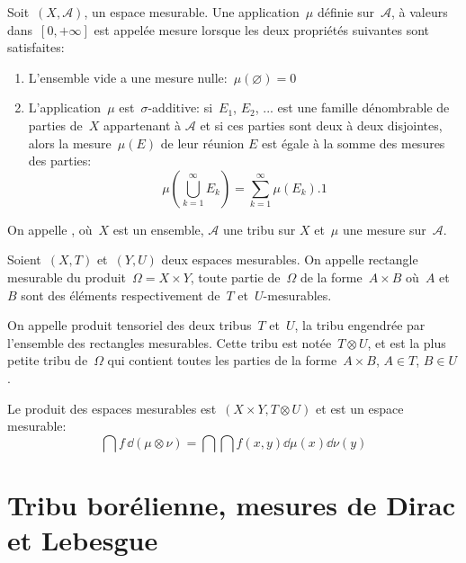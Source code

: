 \begin{definition}[Mesure]
\medskip
Soit~$(X,\mathcal{A})$, un espace mesurable.
Une application~$\mu$ définie sur~$\mathcal{A}$, à valeurs dans~$[0,+\infty]$ est appelée
mesure lorsque les deux propriétés suivantes sont satisfaites:
\begin{enumerate}
  \item L'ensemble vide a une mesure nulle:~$\mu\left(\varnothing\right)=0$
  \item L'application~$\mu$ est~$\sigma$-additive:
si~$E_1$, $E_2$, ... est une famille dénombrable de parties de~$X$ appartenant à
$\mathcal{A}$ et si ces parties sont deux à deux disjointes, alors la mesure~$\mu(E)$ de leur réunion
$E$ est égale à la somme des mesures des parties:
\begin{equation}
\mu\left(\bigcup_{k=1}^{\infty}E_{k}\right)=\sum_{k=1}^{\infty}\mu(E_{k}).1
\end{equation}
\end{enumerate}
\end{definition}

On appelle ,
 où~$X$ est un ensemble, $\mathcal{A}$ une tribu sur
$X$ et~$\mu$ une mesure sur~$\mathcal{A}$.

{}
\begin{remarque}
Soient~$(X,T)$ et~$(Y,U)$ deux espaces mesurables.
On appelle rectangle mesurable du produit~$\Omega=X\times Y$, toute partie de~$\Omega$ de la forme~$A\times B$ où~$A$ et~$B$ sont des éléments respectivement de~$T$ et~$U$-mesurables.

On appelle produit tensoriel des deux tribus~$T$ et~$U$, la tribu engendrée par l'ensemble des rectangles mesurables.
Cette tribu est notée~$T \otimes U$, et est la plus petite tribu de~$\Omega$ qui contient toutes les parties de la forme~$A\times B$, $A\in T$, $B\in U$.

Le produit des espaces mesurables est~$(X\times Y, T \otimes U)$ et est un espace mesurable:
\begin{equation}
\dint f\,\dd(\mu \otimes \nu) = \dint\dint f(x,y) \dd\mu(x)\dd\nu(y)
\end{equation}
\end{remarque}

\medskip
\section{Tribu borélienne, mesures de Dirac et Lebesgue}

